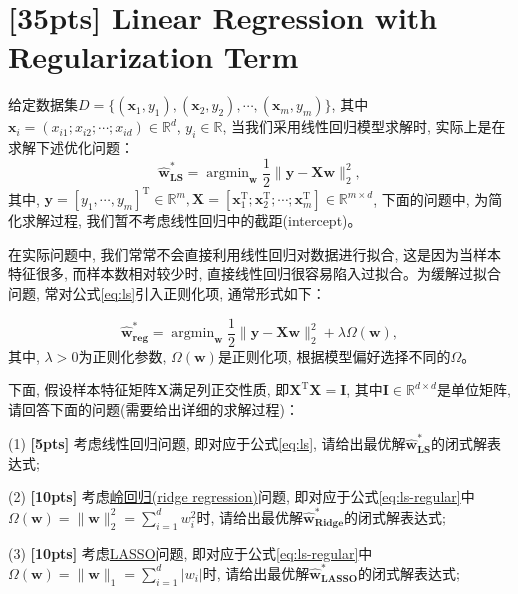 \documentclass[a4paper,UTF8]{article}
\numberwithin{equation}{section}
\theoremstyle{definition}
\begin{document}
\section{[35pts] Linear Regression with Regularization Term}

给定数据集$D = \{(\mathbf{x}_1,y_1),(\mathbf{x}_2,y_2),\cdots,(\mathbf{x}_m,y_m)\}$, 其中$\mathbf{x}_i = (x_{i1};x_{i2};\cdots;x_{id}) \in \mathbb{R}^d$, $y_i \in \mathbb{R}$, 当我们采用线性回归模型求解时, 实际上是在求解下述优化问题：
\begin{equation}
\label{eq:ls}
\hat{\mathbf{w}}_{\textbf{LS}}^* = \mathop{\arg\min}_{\mathbf{w}} \frac{1}{2}\lVert \mathbf{y} - \mathbf {X}\mathbf{w} \rVert_2^2,
\end{equation}
其中, $\mathbf{y} = [y_1,\cdots,y_m]^\mathrm{T} \in \mathbb{R}^m, \mathbf{X} = [\mathbf{x}_1^\mathrm{T};\mathbf{x}_2^\mathrm{T};\cdots;\mathbf{x}_m^\mathrm{T}]\in \mathbb{R}^{m\times d}$, 下面的问题中, 为简化求解过程, 我们暂不考虑线性回归中的截距(intercept)。

在实际问题中, 我们常常不会直接利用线性回归对数据进行拟合, 这是因为当样本特征很多, 而样本数相对较少时, 直接线性回归很容易陷入过拟合。为缓解过拟合问题, 常对公式\eqref{eq:ls}引入正则化项, 通常形式如下：

\begin{equation}
\label{eq:ls-regular}
\hat{\mathbf{w}}_{\textbf{reg}}^* = \mathop{\arg\min}_{\mathbf{w}} \frac{1}{2}\lVert \mathbf{y} - \mathbf X \mathbf{w} \rVert_2^2 +\lambda \Omega(\mathbf{w}),
\end{equation}
其中, $\lambda> 0$为正则化参数, $\Omega(\mathbf{w})$是正则化项, 根据模型偏好选择不同的$\Omega$。

下面, 假设样本特征矩阵$\mathbf{X}$满足列正交性质, 即$\mathbf{X}^\mathrm{T}\mathbf{X} = \mathbf{I}$, 其中$\mathbf{I}\in \mathbb{R}^{d\times d}$是单位矩阵, 请回答下面的问题(需要给出详细的求解过程)：

(1) \textbf{[5pts]} 考虑线性回归问题, 即对应于公式\eqref{eq:ls}, 请给出最优解$\hat{\mathbf{w}}_{\textbf{LS}}^*$的闭式解表达式;

(2) \textbf{[10pts]} 考虑\href{https://en.wikipedia.org/wiki/Tikhonov_regularization}{岭回归(ridge regression)}问题, 即对应于公式\eqref{eq:ls-regular}中$\Omega(\mathbf{w}) = \lVert \mathbf{w}\rVert_2^2=\sum_{i=1}^d w_i^2$时, 请给出最优解$\hat{\mathbf{w}}_{\textbf{Ridge}}^*$的闭式解表达式;

(3) \textbf{[10pts]} 考虑\href{https://en.wikipedia.org/wiki/LASSO}{LASSO}问题, 即对应于公式\eqref{eq:ls-regular}中$\Omega(\mathbf{w}) = \lVert \mathbf{w}\rVert_1=\sum_{i=1}^d \vert w_i\vert$时, 请给出最优解$\hat{\mathbf{w}}_{\textbf{LASSO}}^*$的闭式解表达式;
\end{document}

